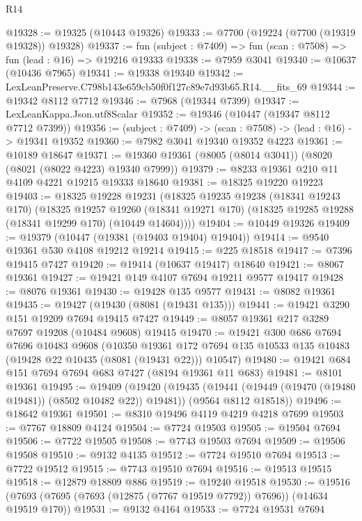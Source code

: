 \begin{lexlean}{R14}
\begin{coremodule}
@19328 := @19325 (@10443 @19326)
@19333 := @7700 (@19224 (@7700 (@19319 @19328)) @19328)
@19337 := fun (subject : @7409) => fun (scan : @7508) => fun (lead : @16) => @19216 @19333
@19338 := @7959 @3041
@19340 := @10637 (@10436 @7965)
@19341 := @19338 @19340
@19342 := LexLeanPreserve.C798b143e659cb50f0f127c89e7d93b65.R14.__fits_69
@19344 := @19342 @8112 @7712
@19346 := @7968 (@19344 @7399)
@19347 := LexLeanKappa.Json.utf8Scalar
@19352 := @19346 (@10447 (@19347 @8112 @7712 @7399))
@19356 := (subject : @7409) -> (scan : @7508) -> (lead : @16) -> @19341 @19352
@19360 := @7982 @3041 @19340 @19352 @4223
@19361 := @10189 @18647
@19371 := @19360 @19361 (@8005 (@8014 @3041)) (@8020 (@8021 (@8022 @4223) @19340 @7999))
@19379 := @8233 @19361 @210 @11 @4109 @4221 @19215 @19333 @18640
@19381 := @18325 @19220 @19223
@19403 := @18325
    @19228
    @19231
    (@18325
      @19235
      @19238
      (@18341 @19243 @170)
      (@18325
        @19257
        @19260
        (@18341 @19271 @170)
        (@18325 @19285 @19288 (@18341 @19299 @170) (@10449 @14604))))
@19404 := @10449 @19326
@19409 := @19379 (@10447 (@19381 (@19403 @19404) @19404))
@19414 := @9540 @19361 @530 @4108 @19212 @19214
@19415 := @225 @18518
@19417 := @7396 @19415 @7427
@19420 := @19414 (@10637 @19417) @18640
@19421 := @8067 @19361
@19427 := @19421 @149 @4107 @7694 @19211 @9577 @19417
@19428 := @8076 @19361
@19430 := @19428 @135 @9577
@19431 := @8082 @19361
@19435 := @19427 (@19430 (@8081 (@19431 @135)))
@19441 := @19421 @3290 @151 @19209 @7694 @19415 @7427
@19449 := @8057 @19361 @217 @3289 @7697 @19208 (@10484 @9608) @19415
@19470 := @19421
    @300
    @686
    @7694
    @7696
    @10483
    @9608
    (@10350
      @19361
      @172
      @7694
      @135
      @10533
      @135
      @10483
      (@19428 @22 @10435 (@8081 (@19431 @22)))
      @10547)
@19480 := @19421 @684 @151 @7694 @7694 @683 @7427 (@8194 @19361 @11 @683)
@19481 := @8101 @19361
@19495 := @19409
    (@19420
      (@19435 (@19441 (@19449 (@19470 (@19480 @19481)) (@8502 @10482 @22)) @19481))
      (@9564 @8112 @18518))
@19496 := @18642 @19361
@19501 := @8310 @19496 @4119 @4219 @4218 @7699
@19503 := @7767 @18809 @4124
@19504 := @7724 @19503
@19505 := @19504 @7694
@19506 := @7722 @19505
@19508 := @7743 @19503 @7694
@19509 := @19506 @19508
@19510 := @9132 @4135
@19512 := @7724 @19510 @7694
@19513 := @7722 @19512
@19515 := @7743 @19510 @7694
@19516 := @19513 @19515
@19518 := @12879 @18809 @886
@19519 := @19240 @19518
@19530 := @19516 (@7693 (@7695 (@7693 (@12875 (@7767 @19519 @7792)) @7696)) (@14634 @19519 @170))
@19531 := @9132 @4164
@19533 := @7724 @19531 @7694

\end{coremodule}
\end{lexlean}

